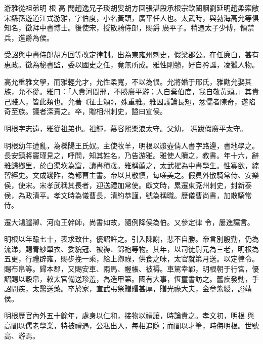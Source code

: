 
\begin{pinyinscope}

 游雅從祖弟明
 根
 高
 閭趙逸兄子琰胡叟胡方回張湛段承根宗欽闞駰劉延明趙柔索敞宋繇孫遊道江式游雅，字伯度，小名黃頭，廣平任人也。太武時，與勃海高允等俱知名，徵拜中書博士。後使宋，授散騎侍郎，賜爵
 廣平子。稍遷太子少傅，領禁兵，進爵為侯。



 受詔與中書侍郎胡方回等改定律制。出為東雍州刺史，假梁郡公。在任廉白，甚有惠政。徵為秘書監，委以國史之任，竟無所成。雅性剛戇，好自矜誕，凌獵人物。



 高允重雅文學，而雅輕允才，允性柔寬，不以為恨。允將婚于邢氏，雅勸允娶其族，允不從。雅曰：「人貴河間邢，不勝廣平游；人自棄伯度，我自敬黃頭。」其貴己賤人，皆此類也。允著《征士頌》，殊重雅。雅因議論長短，忿儒者陳奇，遂陷奇至族。議者深責之。卒，贈相州刺史，謚曰宣侯。



 明根字志遠，雅從祖弟也。祖鱓，慕容熙樂浪太守。父幼，
 馮跋假廣平太守。



 明根幼年遭亂，為櫟陽王氏奴。主使牧羊，明根以漿壺倩人書字路邊，書地學之。長安鎮將竇瑾見之，呼問，知其姓名，乃告游雅。雅使人贖之，教書。年十六，辭雅歸鄉里，於白渠坎為窟，讀書積歲。雅稱薦之，太武擢為中書學生。性寡欲，綜習經史。文成踐阼，為都曹主書。帝以其敬慎，每嗟美之。假員外散騎常侍、安樂侯，使宋。宋孝武稱其長者，迎送禮加常使。獻文時，累遷東兗州刺史，封新泰侯，為政清平。孝文時為儀曹長，清約恭謹，號為稱職。歷儀曹尚書，加散騎常侍。



 遷大鴻臚卿、河南王幹師，尚書如故，隨例降侯為伯。又參定律
 令，屢進讜言。



 明根以年踰七十，表求致仕，優詔許之。引入陳謝，悲不自勝。帝言別殷勤，仍為流涕，賜青紗單衣、委貌冠、被褥、錦袍等物。其年，以司徒尉元為三老，明根為五更，行禮辟雍，賜步挽一乘，給上卿祿，供食之味，太官就第月送。以定律令。賜布帛等。歸本郡，又賜安車、兩馬、幄帳、被褥。車駕幸鄴，明根朝于行宮，優詔賜以穀帛，敕太官備送珍羞，為造甲第。國有大事，恆璽書訪之。舊疾發動，手詔問疾，太醫送藥。卒於家，宣武弔祭贈賵甚厚，贈光祿大夫，金章紫綬，謚靖侯。



 明根歷官內外五十餘年，處身以仁和，接物以禮讓，時論貴之。孝文初，明根
 與高閭以儒老學業，特被禮遇，公私出入，每相追隨；而閭以才筆，時侮明根。世號高、游焉。




\end{pinyinscope}
